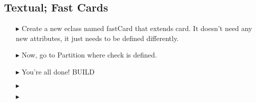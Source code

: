 \newpage
\subsection{Textual; Fast Cards}
\texHeader
\hypertarget{fastCard tex}{}

\begin{itemize}
  
\item[$\blacktriangleright$] Create a new eclass named fastCard that extends card. It doesn't need any new attributes, it just needs to be defined differently.

\item[$\blacktriangleright$] Now, go to Partition where check is defined.

\item[$\blacktriangleright$] You're all done! BUILD

\item[$\blacktriangleright$] 

\item[$\blacktriangleright$] 
  
\end{itemize}
